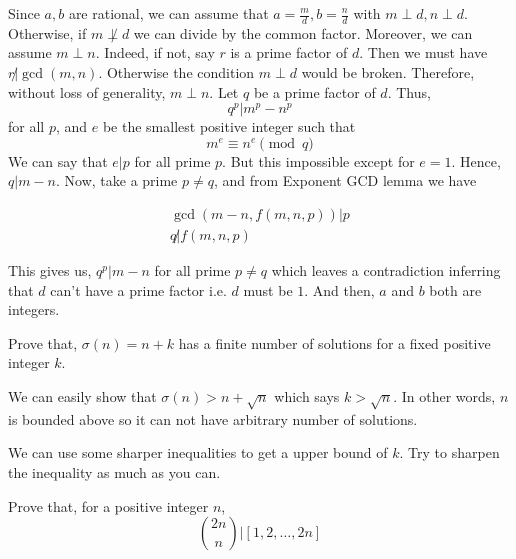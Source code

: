 \documentclass[problems.tex]{subfile}
\begin{document}
	\begin{solution}
		Since $a,b$ are rational, we can assume that $a=\frac{m}{d},b=\frac{n}{d}$ with $m\perp d,n\perp d$. Otherwise, if $m\not\perp d$ we can divide by the common factor. Moreover, we can assume $m\perp n$. Indeed, if not, say $r$ is a prime factor of $d$. Then we must have $r\not|\gcd(m,n)$. Otherwise the condition $m\perp d$ would be broken. Therefore, without loss of generality, $m\perp n$. Let $q$ be a prime factor of $d$. Thus, \[q^p|m^p-n^p\] for all $p$, and $e$ be the smallest positive integer such that \[m^e\equiv n^e\pmod q\]
		We can say that $e|p$ for all prime $p$. But this impossible except for $e=1$. Hence, $q|m-n$. Now, take a prime $p\neq q$, and from Exponent GCD lemma we have 
		
		\begin{align*}
			\gcd\left(m-n,f(m,n,p)\right) | p\\
			q\not|  f(m,n,p)
		\end{align*}
		
		
		
		This gives us, $q^p|m-n$ for all prime $p\neq q$ which leaves a contradiction inferring that $d$ can't have a prime factor i.e. $d$ must be $1$. And then, $a$ and $b$ both are integers.
	\end{solution}
	
	\begin{problem}
		Prove that, $\sigma(n)=n+k$ has a finite number of solutions for a fixed positive integer $k$.
	\end{problem}
	
	\begin{solution}
		We can easily show that $\sigma(n)>n+\sqrt{n}$ which says $k>\sqrt{n}$. In other words, $n$ is bounded above so it can not have arbitrary number of solutions.
	\end{solution}
	
	\begin{note}
		We can use some sharper inequalities to get a upper bound of $k$. Try to sharpen the inequality as much as you can.
	\end{note}
	
	\begin{problem}
		Prove that, for a positive integer $n$, \[\binom{2n}{n}|[1,2,\ldots,2n]\]
	\end{problem}
	
\end{document}

